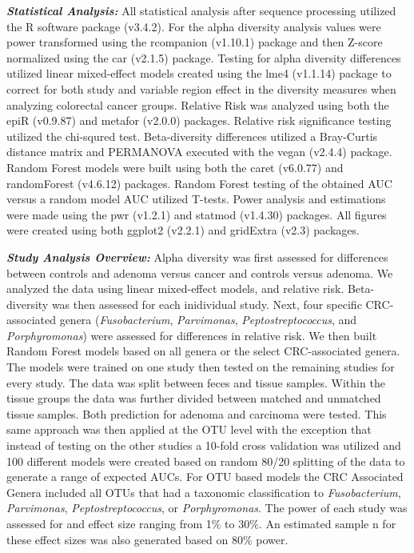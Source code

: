 \documentclass[12pt,]{article}
\begin{document}
\textbf{\emph{Statistical Analysis:}} All statistical analysis after
sequence processing utilized the R software package (v3.4.2). For the
alpha diversity analysis values were power transformed using the
rcompanion (v1.10.1) package and then Z-score normalized using the car
(v2.1.5) package. Testing for alpha diversity differences utilized
linear mixed-effect models created using the lme4 (v1.1.14) package to
correct for both study and variable region effect in the diversity
measures when analyzing colorectal cancer groups. Relative Risk was
analyzed using both the epiR (v0.9.87) and metafor (v2.0.0) packages.
Relative risk significance testing utilized the chi-squred test.
Beta-diversity differences utilized a Bray-Curtis distance matrix and
PERMANOVA executed with the vegan (v2.4.4) package. Random Forest models
were built using both the caret (v6.0.77) and randomForest (v4.6.12)
packages. Random Forest testing of the obtained AUC versus a random
model AUC utilized T-tests. Power analysis and estimations were made
using the pwr (v1.2.1) and statmod (v1.4.30) packages. All figures were
created using both ggplot2 (v2.2.1) and gridExtra (v2.3) packages.

\textbf{\emph{Study Analysis Overview:}} Alpha diversity was first
assessed for differences between controls and adenoma versus cancer and
controls versus adenoma. We analyzed the data using linear mixed-effect
models, and relative risk. Beta-diversity was then assessed for each
inidividual study. Next, four specific CRC-associated genera
(\emph{Fusobacterium}, \emph{Parvimonas}, \emph{Peptostreptococcus}, and
\emph{Porphyromonas}) were assessed for differences in relative risk. We
then built Random Forest models based on all genera or the select
CRC-associated genera. The models were trained on one study then tested
on the remaining studies for every study. The data was split between
feces and tissue samples. Within the tissue groups the data was further
divided between matched and unmatched tissue samples. Both prediction
for adenoma and carcinoma were tested. This same approach was then
applied at the OTU level with the exception that instead of testing on
the other studies a 10-fold cross validation was utilized and 100
different models were created based on random 80/20 splitting of the
data to generate a range of expected AUCs. For OTU based models the CRC
Associated Genera included all OTUs that had a taxonomic classification
to \emph{Fusobacterium}, \emph{Parvimonas}, \emph{Peptostreptococcus},
or \emph{Porphyromonas}. The power of each study was assessed for and
effect size ranging from 1\% to 30\%. An estimated sample n for these
effect sizes was also generated based on 80\% power.
\end{document}
